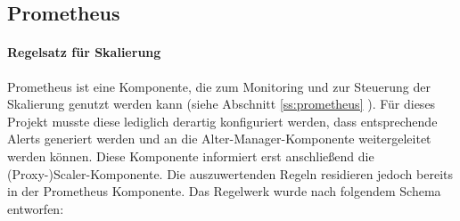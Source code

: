\newpage

\subsection{Prometheus}

\paragraph{Regelsatz für Skalierung}
Prometheus ist eine Komponente, die zum Monitoring und zur Steuerung der Skalierung genutzt werden kann (siehe Abschnitt \ref{ss:prometheus} ). Für dieses Projekt musste diese lediglich derartig konfiguriert werden, dass entsprechende Alerts generiert werden und an die Alter-Manager-Komponente weitergeleitet werden können. Diese Komponente informiert erst anschließend die (Proxy-)Scaler-Komponente. Die auszuwertenden Regeln residieren jedoch bereits in der Prometheus Komponente. Das Regelwerk wurde nach folgendem Schema entworfen:

\bigskip

